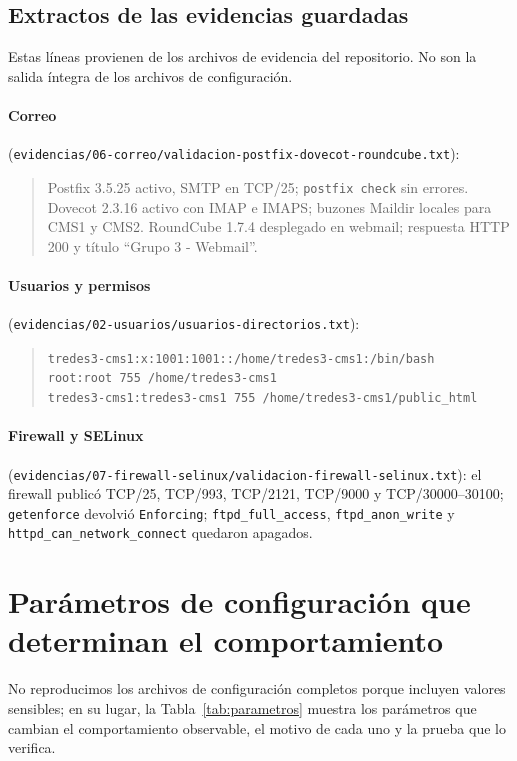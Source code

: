 \documentclass[11pt,a4paper]{article}
\newcommand{\ruta}[1]{\nolinkurl{#1}}
\begin{document}
\subsection{Extractos de las evidencias guardadas}
Estas líneas provienen de los archivos de evidencia del repositorio. No son la salida íntegra de los archivos de configuración.

\paragraph{Correo} (\ruta{evidencias/06-correo/validacion-postfix-dovecot-roundcube.txt}):
\begin{quote}\small
Postfix 3.5.25 activo, SMTP en TCP/25; \texttt{postfix check} sin errores. Dovecot 2.3.16 activo con IMAP e IMAPS; buzones Maildir locales para CMS1 y CMS2. RoundCube 1.7.4 desplegado en webmail; respuesta HTTP 200 y título ``Grupo 3 - Webmail''.
\end{quote}

\paragraph{Usuarios y permisos} (\ruta{evidencias/02-usuarios/usuarios-directorios.txt}):
\begin{quote}\small
\texttt{tredes3-cms1:x:1001:1001::/home/tredes3-cms1:/bin/bash}\\
\texttt{root:root 755 /home/tredes3-cms1}\\
\texttt{tredes3-cms1:tredes3-cms1 755 /home/tredes3-cms1/public\_html}
\end{quote}

\paragraph{Firewall y SELinux} (\ruta{evidencias/07-firewall-selinux/validacion-firewall-selinux.txt}): el firewall publicó TCP/25, TCP/993, TCP/2121, TCP/9000 y TCP/30000--30100; \texttt{getenforce} devolvió \texttt{Enforcing}; \texttt{ftpd\_full\_access}, \texttt{ftpd\_anon\_write} y \texttt{httpd\_can\_network\_connect} quedaron apagados.

\appendix
\section{Parámetros de configuración que determinan el comportamiento}
No reproducimos los archivos de configuración completos porque incluyen valores sensibles; en su lugar, la Tabla~\ref{tab:parametros} muestra los parámetros que cambian el comportamiento observable, el motivo de cada uno y la prueba que lo verifica.
\end{document}
